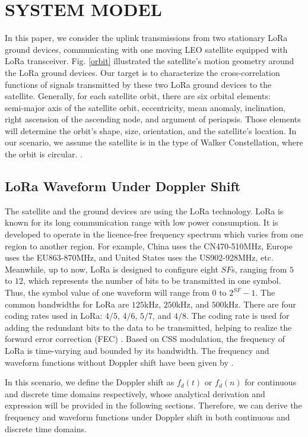 \documentclass{IEEEtaes}
\theoremstyle{plain}
\begin{document}
\section{SYSTEM MODEL}
\label{System model}
In this paper, we consider the uplink transmissions from two stationary LoRa ground devices, communicating with one moving LEO satellite equipped with LoRa transceiver. Fig. \ref{orbit} illustrated the satellite's motion geometry around the LoRa ground devices. Our target is to characterize the cross-correlation functions of signals transmitted by these two LoRa ground devices to the satellite.
Generally, for each satellite orbit, there are six orbital elements: semi‑major axis of the satellite orbit, eccentricity, mean anomaly, inclination, right ascension of the ascending node, and argument of periapsis\cite{rouzegar2019estimation}. Those elements will determine the orbit's shape, size, orientation, and the satellite's location. In our scenario, we assume the satellite is in the type of Walker Constellation, where the orbit is circular. \cite{doroshkin2019experimental,lapapan2021lora}.

\subsection{LoRa Waveform Under Doppler Shift}
The satellite and the ground devices are using the LoRa technology. LoRa is known for its long communication range with low power consumption. It is developed to operate in the licence-free frequency spectrum which varies from one region to another region. For example, China uses the CN470-510MHz, Europe uses the EU863-870MHz, and United States uses the US902-928MHz, etc. Meanwhile, up to now, LoRa is designed to configure eight $SF$s, ranging from $5$ to $12$, which represents the number of bits to be transmitted in one symbol. Thus, the symbol value of one waveform will range from $0$ to $2^{SF}\!-\!1$. The common bandwidths for LoRa are $125$kHz, $250$kHz, and $500$kHz. There are four coding rates used in LoRa: $4/5$, $4/6$, $5/7$, and $4/8$. The coding rate is used for adding the redundant bits to the data to be transmitted, helping to realize the forward error correction (FEC) \cite{Semtech_LoRa,LoRaWAN,bor2016lora}. 
Based on CSS modulation, the frequency of LoRa is time-varying and bounded by its bandwidth. The frequency and waveform functions without Doppler shift have been given by \cite{benkhelifa2022orthogonal,chiani2019lora}.

In this scenario, we define the Doppler shift as $f_d(t)$ or $f_d(n)$ for continuous and discrete time domains respectively, whose analytical derivation and expression will be provided in the following sections. Therefore, we can derive the frequency and waveform functions under Doppler shift in both continuous and discrete time domains.
\end{document}
